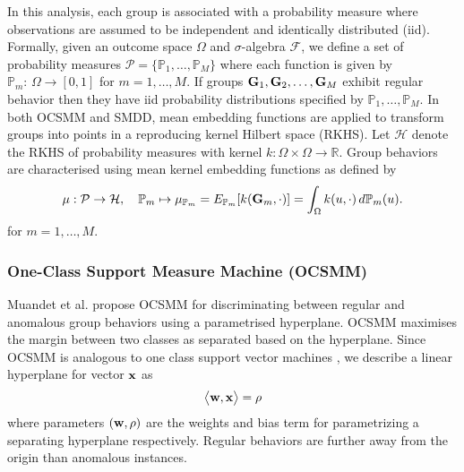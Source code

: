 
 In this analysis, each  group   is associated with a probability measure where observations  are assumed to be  independent and identically distributed (iid). 
Formally, %
given an  outcome space $\Omega$ and $\sigma$-algebra $\mathcal{F}$, we define a set of probability measures $\mathcal{P}=\{\mathbb{P}_1,\dots,\mathbb{P}_M\}$  
where each function is given by $\mathbb{P}_m: \, \Omega \to [0,1]
$ for $m=1,\dots, M$. 
If groups  ${\bf G}_1,{\bf G}_2,\dots,{\bf G}_M$ exhibit regular behavior then they have iid probability distributions specified by $\mathbb{P}_1,\dots,\mathbb{P}_M$.  %
 In both OCSMM and SMDD, mean embedding functions are applied to transform groups into points in a reproducing kernel Hilbert space (RKHS). 
   Let $\mathcal{H}$ denote the RKHS of probability measures with   kernel $k:\Omega \times \Omega  \to\mathbb{R}$.  Group behaviors are characterised using mean kernel embedding functions as defined by 
 \begin{align}
\mu :  \mathcal{P}\to \mathcal{H}, \quad\mathbb{P}_m \mapsto \mu_{\mathbb{P}_m}=E_{\mathbb{P}_m} [ k({\bf G}_m,\cdot) ] =\int_{\Omega} k(u,\cdot)\, d\mathbb{P}_m(u).  \label{KMF}
 \end{align}
 for $m=1,\dots,M$. 
 

  

\subsubsection{ One-Class Support Measure Machine (OCSMM) }
 Muandet et al. \cite{OCSMM} propose OCSMM for  discriminating between regular and anomalous  group behaviors using a parametrised hyperplane. OCSMM maximises
 the margin between two classes as separated based on the hyperplane.  
{  Since OCSMM is  analogous to one class support vector machines  \cite{OCSVM}, we describe a linear hyperplane for vector ${\bf x}$ as } 
\[ %
\big\langle {\bf w}, {\bf x} \big \rangle = \rho \]
where parameters $({\bf w}, \rho)$ are the weights and bias term for parametrizing a separating hyperplane respectively.  Regular behaviors are further away from  the origin than anomalous instances. 

